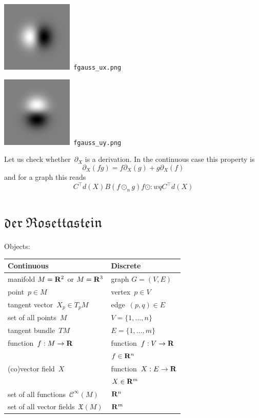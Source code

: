 \includegraphics{fgauss_ux.png}\verb+ fgauss_ux.png+

\includegraphics{fgauss_uy.png}\verb+ fgauss_uy.png+


Let us check whether~$\partial_X$ is a derivation.  In the continuous case
this property is
\[
	\partial_X\left(fg\right)
	=
	f\partial_X\left(g\right)
	+
	g\partial_X\left(f\right)
\]
and for a graph this reads
\[
	C^\top d(X)B\left(f\odot_n g\right)
	f\odot :wqC^\top d(X)
\]

\clearpage
\section{$\mathfrak{der\ Rosettastein}$}

Objects:\newline
\begin{tabular}{|l|l|}
	\hline
	{\bf Continuous} & {\bf Discrete} \\
	\hline
	manifold $M=\mathbf{R}^2$ or $M=\mathbf{R}^3$ & graph $G=(V,E)$ \\
	\hline
	point~$p\in M$ & vertex~$p\in V$ \\
	\hline
	tangent vector~$X_p\in T_pM$ & edge~$(p,q)\in E$ \\
	\hline
	set of all points~$M$ & $V=\{1,\ldots,n\}$ \\
	\hline
	tangent bundle~$TM$ & $E=\{1,\ldots,m\}$ \\
	\hline
	function~$f:M\to\mathbf{R}$ & function~$f:V\to\mathbf{R}$ \\
	& $f\in\mathbf{R}^n$ \\
	\hline
	(co)vector field~$X$ & function~$X:E\to\mathbf{R}$ \\
	& $X\in\mathbf{R}^m$ \\
	\hline
	set of all functions~$\mathcal{C}^\infty(M)$ & $\mathbf{R}^n$ \\
	\hline
	set of all vector fields~$\mathfrak{X}(M)$ & $\mathbf{R}^m$ \\
	\hline
\end{tabular}

